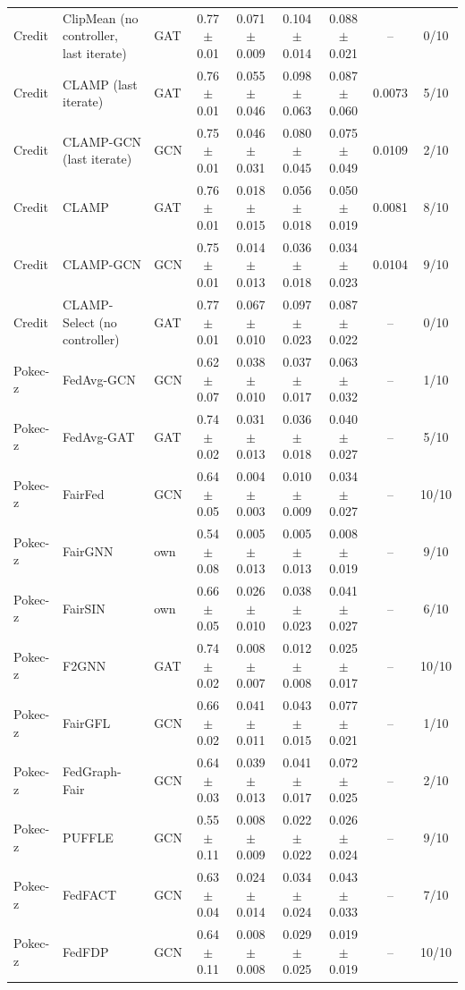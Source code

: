 \begin{longtable}{lp{2.2cm}lcccccc}
Credit & ClipMean (no controller, last iterate) & GAT & 0.77$\pm$0.01 & 0.071$\pm$0.009 & 0.104$\pm$0.014 & 0.088$\pm$0.021 & -- & 0/10 \\
Credit & CLAMP (last iterate) & GAT & 0.76$\pm$0.01 & 0.055$\pm$0.046 & 0.098$\pm$0.063 & 0.087$\pm$0.060 & 0.0073 & 5/10 \\
Credit & CLAMP-GCN (last iterate) & GCN & 0.75$\pm$0.01 & 0.046$\pm$0.031 & 0.080$\pm$0.045 & 0.075$\pm$0.049 & 0.0109 & 2/10 \\
Credit & CLAMP & GAT & 0.76$\pm$0.01 & 0.018$\pm$0.015 & 0.056$\pm$0.018 & 0.050$\pm$0.019 & 0.0081 & 8/10 \\
Credit & CLAMP-GCN & GCN & 0.75$\pm$0.01 & 0.014$\pm$0.013 & 0.036$\pm$0.018 & 0.034$\pm$0.023 & 0.0104 & 9/10 \\
Credit & CLAMP-Select (no controller) & GAT & 0.77$\pm$0.01 & 0.067$\pm$0.010 & 0.097$\pm$0.023 & 0.087$\pm$0.022 & -- & 0/10 \\
Pokec-z & FedAvg-GCN & GCN & 0.62$\pm$0.07 & 0.038$\pm$0.010 & 0.037$\pm$0.017 & 0.063$\pm$0.032 & -- & 1/10 \\
Pokec-z & FedAvg-GAT & GAT & 0.74$\pm$0.02 & 0.031$\pm$0.013 & 0.036$\pm$0.018 & 0.040$\pm$0.027 & -- & 5/10 \\
Pokec-z & FairFed & GCN & 0.64$\pm$0.05 & 0.004$\pm$0.003 & 0.010$\pm$0.009 & 0.034$\pm$0.027 & -- & 10/10 \\
Pokec-z & FairGNN & own & 0.54$\pm$0.08 & 0.005$\pm$0.013 & 0.005$\pm$0.013 & 0.008$\pm$0.019 & -- & 9/10 \\
Pokec-z & FairSIN & own & 0.66$\pm$0.05 & 0.026$\pm$0.010 & 0.038$\pm$0.023 & 0.041$\pm$0.027 & -- & 6/10 \\
Pokec-z & F2GNN & GAT & 0.74$\pm$0.02 & 0.008$\pm$0.007 & 0.012$\pm$0.008 & 0.025$\pm$0.017 & -- & 10/10 \\
Pokec-z & FairGFL & GCN & 0.66$\pm$0.02 & 0.041$\pm$0.011 & 0.043$\pm$0.015 & 0.077$\pm$0.021 & -- & 1/10 \\
Pokec-z & FedGraph-Fair & GCN & 0.64$\pm$0.03 & 0.039$\pm$0.013 & 0.041$\pm$0.017 & 0.072$\pm$0.025 & -- & 2/10 \\
Pokec-z & PUFFLE & GCN & 0.55$\pm$0.11 & 0.008$\pm$0.009 & 0.022$\pm$0.022 & 0.026$\pm$0.024 & -- & 9/10 \\
Pokec-z & FedFACT & GCN & 0.63$\pm$0.04 & 0.024$\pm$0.014 & 0.034$\pm$0.024 & 0.043$\pm$0.033 & -- & 7/10 \\
Pokec-z & FedFDP & GCN & 0.64$\pm$0.11 & 0.008$\pm$0.008 & 0.029$\pm$0.025 & 0.019$\pm$0.019 & -- & 10/10 \\

\end{longtable}
